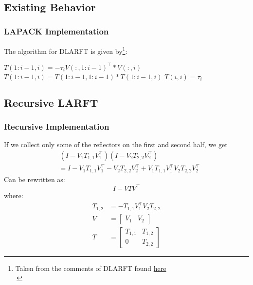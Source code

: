 \documentclass[12pt]{beamer}
\begin{document}
    \subsection{Existing Behavior}
    \begin{frame}
        \frametitle{LAPACK Implementation}
        The algorithm for DLARFT is given by\footnote{Taken from the comments of DLARFT found \textcolor{blue}{\href{https://netlib.org/lapack/explore-html//dd/daa/dlarft_8f_source.html}{here}}\\\,}:
        \begin{algorithmic}
                \State $T(1:i-1,i) = -\tau_i V(:,1:i-1)^\top * V(:,i)$
                \State $T(1:i-1,i) = T(1:i-1,1:i-1) * T(1:i-1,i)$
                \State $T(i,i) = \tau_i$
            \EndFor
        \end{algorithmic}

    \end{frame}
    \subsection{Recursive LARFT}
    \begin{frame}
        \frametitle{Recursive Implementation}
        If we collect only some of the reflectors on the first and second half, we get
        \begin{align*}
            &\,(I - V_1T_{1,1}V_1^\top)(I - V_2T_{2,2}V_2^\top) \\
            &= I - V_1T_{1,1}V_1^\top - V_2T_{2,2}V_2^\top + V_1T_{1,1}V_1^\top V_2T_{2,2}V_2^\top
        \end{align*}
        Can be rewritten as:
        $$
            I - VTV^\top
        $$
        where:
        \begin{align*}
            T_{1,2} &= -T_{1,1}V_1^\top V_2T_{2,2} \\
            V &= \begin{bmatrix}
                V_1 & V_2
            \end{bmatrix}\\
            T &= \begin{bmatrix}
                T_{1,1} & T_{1,2} \\
                0       & T_{2,2}
            \end{bmatrix}
        \end{align*}
    \end{frame}
\end{document}
